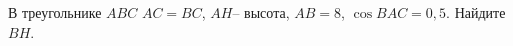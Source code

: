 \begin{ex}
	\begin{condition}
		В треугольнике \(ABC\) \( AC=BC \), \( AH – \) высота, \( AB=8 \),  \( \cos BAC=0,5 \). Найдите \( BH \).
	\end{condition}
\end{ex}